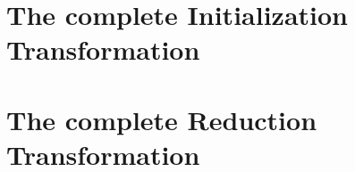 \documentclass[submission]{eptcs}
\begin{document}



\appendix
\newpage

\section{The complete Initialization Transformation}
\label{sec:init-code}



\section{The complete Reduction Transformation}
\label{sec:reduction-code}


\end{document}
